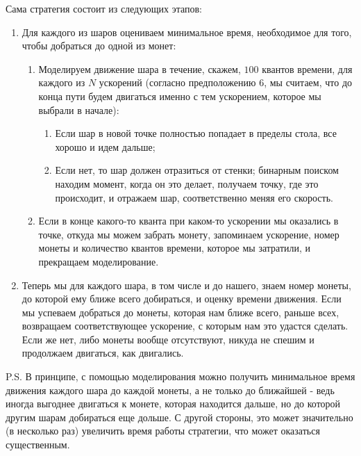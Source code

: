 \documentclass[12pt,a4paper]{article}
\begin{document}
Сама стратегия состоит из следующих этапов:
\begin{enumerate} 
\item Для каждого из шаров оцениваем минимальное время, необходимое для того, чтобы добраться до одной из монет:
\begin{enumerate} 
\item Моделируем движение шара в течение, скажем, \(100\) квантов времени, для каждого из \(N\) ускорений (согласно предположению 6, мы считаем, что до конца пути будем двигаться именно с тем ускорением, которое мы выбрали в начале):
\begin{enumerate} 
\item Если шар в новой точке полностью попадает в пределы стола, все хорошо и идем дальше;
\item Если нет, то шар должен отразиться от стенки; бинарным поиском находим момент, когда он это делает, получаем точку, где это происходит, и отражаем шар, соответственно меняя его скорость.
\end{enumerate} 
\item Если в конце какого-то кванта при каком-то ускорении мы оказались в точке, откуда мы можем забрать монету, запоминаем ускорение, номер монеты и количество квантов времени, которое мы затратили, и прекращаем моделирование.
\end{enumerate} 
\item Теперь мы для каждого шара, в том числе и до нашего, знаем номер монеты, до которой ему ближе всего добираться, и оценку времени движения. Если мы успеваем добраться до монеты, которая нам ближе всего, раньше всех, возвращаем соответствующее ускорение, с которым нам это удастся сделать. Если же нет, либо монеты вообще отсутствуют, никуда не спешим и продолжаем двигаться, как двигались.
\end{enumerate} 

P.S. В принципе, с помощью моделирования можно получить минимальное время движения каждого шара до каждой монеты, а не только до ближайшей - ведь иногда выгоднее двигаться к монете, которая находится дальше, но до которой другим шарам добираться еще дольше. С другой стороны, это может значительно (в несколько раз) увеличить время работы стратегии, что может оказаться существенным.
\end{document}
